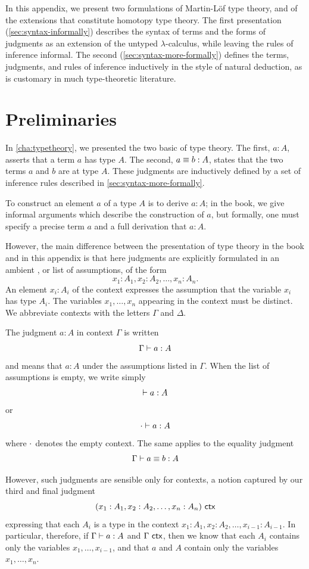 In this appendix, we present two formulations of Martin-L\"{o}f type
theory, and of the extensions that constitute homotopy type theory.
The first presentation (\cref{sec:syntax-informally}) describes the syntax of
terms and the forms of judgments as an extension of the untyped
$\lambda$-calculus, while leaving the rules of inference informal.
The second (\cref{sec:syntax-more-formally}) defines the terms, judgments,
and rules of inference inductively in the style of natural deduction, as
is customary in much type-theoretic literature.

\section*{Preliminaries}
\label{sec:formal-prelim}


In \cref{cha:typetheory}, we presented the two basic 
of type theory. The first, $a:A$, asserts that a term $a$ has type $A$. The second,
$a\equiv b:A$, states that the two terms $a$ and $b$ are %
at type $A$. These judgments are inductively defined by a set of
inference rules described in \cref{sec:syntax-more-formally}.

To construct an element $a$ of a type $A$ is to derive $a:A$; in the book, we
give informal arguments which describe the construction of $a$, but formally,
one must specify a precise term $a$ and a full derivation that $a:A$.

However, the main difference between the presentation of type theory in the book
and in this appendix is that here judgments are explicitly
formulated in an ambient ,
or list of assumptions, of the form
\[
  x_1:A_1, x_2:A_2,\dots,x_n:A_n.
\]
An element $x_i : A_i$ of the context expresses the assumption that the
variable
%
$x_i$ has type $A_i$. The variables $x_1, \ldots, x_n$ appearing in
the context must be distinct. We abbreviate contexts with the letters $\Gamma$
and $\Delta$.

The judgment $a:A$ in context $\Gamma$ is written 
\[ \Gamma \vdash a : A \]
and means that $a:A$ under the assumptions listed in $\Gamma$. When the list of
assumptions is empty, we write simply
\[ \vdash a : A \]
or
\[ \cdot \vdash a : A \]
where $\cdot$ denotes the empty context. The same applies to the equality
judgment
\[
  \Gamma \vdash a \equiv b : A
\]

However, such judgments are sensible only for  contexts,
%
a notion captured by our third and final judgment
\[
  (x_1:A_1, x_2:A_2,\dots,x_n:A_n)\ \mathsf{ctx}
\]
expressing that each $A_i$ is a type in the context $x_1:A_1,
x_2:A_2,\dots,x_{i-1}:A_{i-1}$.  In particular, therefore, if $\Gamma \vdash a : A$ and
$\Gamma\ \mathsf{ctx}$, then we know that each $A_i$ contains only the variables
$x_1,\dots,x_{i-1}$, and that $a$ and $A$ contain only the variables
$x_1,\dots,x_n$.

